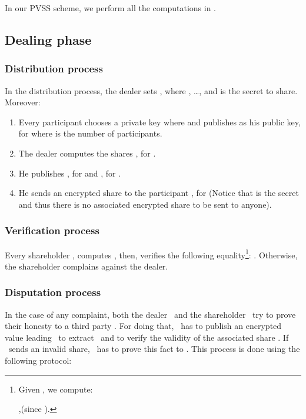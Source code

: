 \documentclass[submission,copyright,creativecommons]{eptcs}
\begin{document}
In our PVSS scheme, we perform all the computations in .

\subsection{Dealing phase}

\subsubsection{Distribution process}

In the distribution process, the dealer sets , where , \ldots ,  and  is the secret to share. Moreover:

\begin{enumerate}
\item Every participant chooses a private key  where 
and publishes  as his public key, for  where  is the number of participants.

\item The dealer  computes the shares  , for .

\item He publishes , for  and , for .

\item He sends an encrypted  
share  to
the participant , for  (Notice that  is the secret and thus there is no associated encrypted share to be sent to anyone).
\end{enumerate}

\subsubsection{Verification process}

Every shareholder , computes , then, verifies the following equality\footnote{Given   , we compute:
\par
     ,(since ).}: .
Otherwise, the shareholder complains against the dealer.

\subsubsection{Disputation process}

In the case of any complaint, both the dealer \ and the shareholder \ try to prove their honesty to a third party . For doing that, \ has to publish an encrypted value leading \ to extract \ and to verify the validity of the associated share . If \ sends
an invalid share, \ has to prove this fact to . This process is
done using the following protocol:
\end{document}
